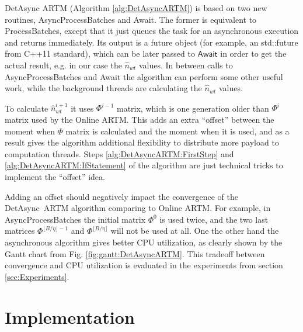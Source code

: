 \documentclass[russian,english]{llncs}
\newcommand{\kw}[1]{\textsf{#1}}
\begin{document}
\kw{DetAsync ARTM} (Algorithm \ref{alg:DetAsyncARTM}) is based on two new routines, \kw{AsyncProcessBatches} and \kw{Await}.
The former is equivalent to \kw{ProcessBatches}, except that it just queues the task for an asynchronous execution and returns immediately.
Its output is a future object (for example, an \kw{std::future} from \kw{C++11} standard),
which can be later passed to $\kw{Await}$ in order to get the actual result, e.g. in our case the $\hat n_{wt}$ values.
In between calls to \kw{AsyncProcessBatches} and \kw{Await} the algorithm
can perform some other useful work, while the background threads are calculating the $\hat n_{wt}$ values.

To calculate $\hat n^{i+1}_{wt}$ it uses $\Phi^{i-1}$ matrix,
which is one generation older than $\Phi^{i}$ matrix used by the \kw{Online ARTM}.
This adds an extra ``offset'' between the moment when $\Phi$ matrix is calculated and the moment when it is used,
and as a result gives the algorithm additional flexibility to distribute more payload to computation threads.
Steps \ref{alg:DetAsyncARTM:FirstStep} and \ref{alg:DetAsyncARTM:IfStatement} of the algorithm
are just technical tricks to implement the ``offset'' idea.

Adding an offset should negatively impact the convergence of the \kw{DetAsync~ARTM} algorithm
comparing to \kw{Online ARTM}.
For example, in \kw{AsyncProcessBatches} the initial matrix $\Phi^0$ is used twice,
and the two last matrices $\Phi^{\lfloor B / \eta \rfloor - 1}$ and $\Phi^{\lfloor B / \eta \rfloor}$ will not be used at all.
One the other hand the asynchronous algorithm gives better CPU utilization,
as clearly shown by the Gantt chart from Fig. \ref{fig:gantt:DetAsyncARTM}.
This tradeoff between convergence and CPU utilization is evaluated in the experiments from section \ref{sec:Experiments}.

\section{Implementation}
\label{sec:Architecture}
\end{document}
